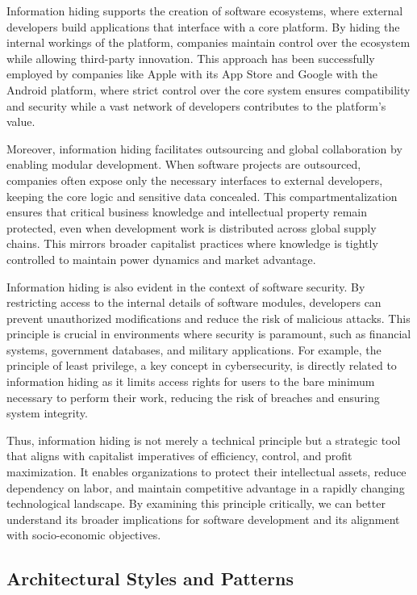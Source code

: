 \begin{refsection}
Information hiding supports the creation of software ecosystems, where external developers build applications that interface with a core platform. By hiding the internal workings of the platform, companies maintain control over the ecosystem while allowing third-party innovation. This approach has been successfully employed by companies like Apple with its App Store and Google with the Android platform, where strict control over the core system ensures compatibility and security while a vast network of developers contributes to the platform's value.

Moreover, information hiding facilitates outsourcing and global collaboration by enabling modular development. When software projects are outsourced, companies often expose only the necessary interfaces to external developers, keeping the core logic and sensitive data concealed. This compartmentalization ensures that critical business knowledge and intellectual property remain protected, even when development work is distributed across global supply chains. This mirrors broader capitalist practices where knowledge is tightly controlled to maintain power dynamics and market advantage.

Information hiding is also evident in the context of software security. By restricting access to the internal details of software modules, developers can prevent unauthorized modifications and reduce the risk of malicious attacks. This principle is crucial in environments where security is paramount, such as financial systems, government databases, and military applications. For example, the principle of least privilege, a key concept in cybersecurity, is directly related to information hiding as it limits access rights for users to the bare minimum necessary to perform their work, reducing the risk of breaches and ensuring system integrity.

Thus, information hiding is not merely a technical principle but a strategic tool that aligns with capitalist imperatives of efficiency, control, and profit maximization. It enables organizations to protect their intellectual assets, reduce dependency on labor, and maintain competitive advantage in a rapidly changing technological landscape. By examining this principle critically, we can better understand its broader implications for software development and its alignment with socio-economic objectives.

\subsection{Architectural Styles and Patterns}


\end{refsection}
